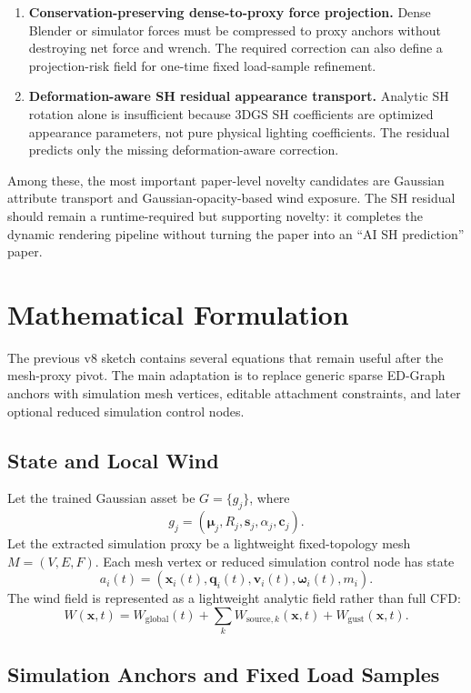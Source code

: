 \documentclass[11pt]{article}
\begin{document}
\begin{enumerate}
  \item \textbf{Conservation-preserving dense-to-proxy force projection.}
  Dense Blender or simulator forces must be compressed to proxy anchors without destroying net force and wrench. The required correction can also define a projection-risk field for one-time fixed load-sample refinement.
  \item \textbf{Deformation-aware SH residual appearance transport.}
  Analytic SH rotation alone is insufficient because 3DGS SH coefficients are optimized appearance parameters, not pure physical lighting coefficients. The residual predicts only the missing deformation-aware correction.
\end{enumerate}

Among these, the most important paper-level novelty candidates are Gaussian attribute transport and Gaussian-opacity-based wind exposure. The SH residual should remain a runtime-required but supporting novelty: it completes the dynamic rendering pipeline without turning the paper into an ``AI SH prediction'' paper.

\section{Mathematical Formulation}

The previous v8 sketch contains several equations that remain useful after the mesh-proxy pivot. The main adaptation is to replace generic sparse ED-Graph anchors with simulation mesh vertices, editable attachment constraints, and later optional reduced simulation control nodes.

\subsection{State and Local Wind}

Let the trained Gaussian asset be \(G=\{g_j\}\), where
\[
  g_j = (\boldsymbol{\mu}_j, R_j, \mathbf{s}_j, \alpha_j, \mathbf{c}_j).
\]
Let the extracted simulation proxy be a lightweight fixed-topology mesh \(M=(V,E,F)\). Each mesh vertex or reduced simulation control node has state
\[
  a_i(t) = (\mathbf{x}_i(t), \mathbf{q}_i(t), \mathbf{v}_i(t), \boldsymbol{\omega}_i(t), m_i).
\]
The wind field is represented as a lightweight analytic field rather than full CFD:
\[
  W(\mathbf{x},t)
  =
  W_{\mathrm{global}}(t)
  + \sum_k W_{\mathrm{source},k}(\mathbf{x},t)
  + W_{\mathrm{gust}}(\mathbf{x},t).
\]

\subsection{Simulation Anchors and Fixed Load Samples}
\end{document}
